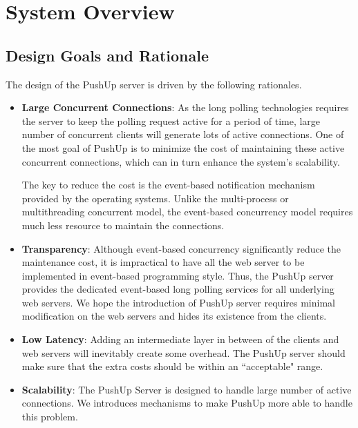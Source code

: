 \section {System Overview\\}

\subsection{Design Goals and Rationale\\}
The design of the PushUp server is driven by the following rationales.
\begin{itemize}
\item {\bf Large Concurrent Connections}:
    As the long polling technologies requires the server to keep the polling
    request active for a period of time, large number of concurrent clients 
    will generate lots of active connections. One of the most goal of PushUp
    is to minimize the cost of maintaining these active concurrent connections,
    which can in turn enhance the system's scalability.
     
    The key to reduce the cost is the event-based notification mechanism 
    provided by the operating systems. Unlike the multi-process or 
    multithreading concurrent model, the event-based concurrency model 
    requires much less resource to maintain the connections.

\item {\bf Transparency}: Although event-based concurrency significantly 
    reduce the maintenance cost, it is impractical to have all the web 
    server to be implemented in event-based programming style. Thus, the 
    PushUp server provides the dedicated event-based long polling services
    for all underlying web servers. We hope the introduction of PushUp server
    requires minimal modification on the web servers and hides its existence
    from the clients.

\item {\bf Low Latency}: Adding an intermediate layer in between of the 
    clients and web servers will inevitably create some overhead. 
    The PushUp server should make sure that the extra costs should be within
    an ``acceptable" range.

\item {\bf Scalability}: The PushUp Server is designed to handle large number of
    active connections. We introduces mechanisms to make PushUp more able to
    handle this problem. 

\end{itemize}

